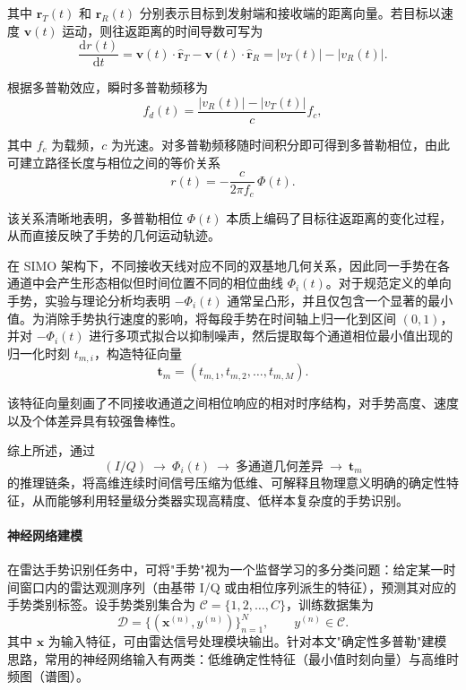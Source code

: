 其中 $\mathbf{r}_T(t)$ 和 $\mathbf{r}_R(t)$ 分别表示目标到发射端和接收端的距离向量。若目标以速度 $\mathbf{v}(t)$ 运动，则往返距离的时间导数可写为
\begin{equation}
\frac{\mathrm{d}r(t)}{\mathrm{d}t}
=
\mathbf{v}(t)\cdot\hat{\mathbf{r}}_T
-
\mathbf{v}(t)\cdot\hat{\mathbf{r}}_R
=
|v_T(t)|-|v_R(t)|.
\end{equation}

根据多普勒效应，瞬时多普勒频移为
\begin{equation}
f_d(t)=\frac{|v_R(t)|-|v_T(t)|}{c}f_c,
\end{equation}

其中 $f_c$ 为载频，$c$ 为光速。对多普勒频移随时间积分即可得到多普勒相位，由此可建立路径长度与相位之间的等价关系
\begin{equation}
r(t) = -\frac{c}{2\pi f_c}\,\Phi(t).
\end{equation}

该关系清晰地表明，多普勒相位 $\Phi(t)$ 本质上编码了目标往返距离的变化过程，从而直接反映了手势的几何运动轨迹。

在 SIMO 架构下，不同接收天线对应不同的双基地几何关系，因此同一手势在各通道中会产生形态相似但时间位置不同的相位曲线 $\Phi_i(t)$。对于规范定义的单向手势，实验与理论分析均表明 $-\Phi_i(t)$ 通常呈凸形，并且仅包含一个显著的最小值。为消除手势执行速度的影响，将每段手势在时间轴上归一化到区间 $(0,1)$，并对 $-\Phi_i(t)$ 进行多项式拟合以抑制噪声，然后提取每个通道相位最小值出现的归一化时刻 $t_{m,i}$，构造特征向量
\begin{equation}
\mathbf{t}_m=(t_{m,1},t_{m,2},\ldots,t_{m,M}).
\end{equation}

该特征向量刻画了不同接收通道之间相位响应的相对时序结构，对手势高度、速度以及个体差异具有较强鲁棒性。

综上所述，通过
\begin{equation}
(I/Q)\ \rightarrow\ \Phi_i(t)\ \rightarrow\ \text{多通道几何差异}\ \rightarrow\ \mathbf{t}_m
\end{equation}
的推理链条，将高维连续时间信号压缩为低维、可解释且物理意义明确的确定性特征，从而能够利用轻量级分类器实现高精度、低样本复杂度的手势识别。

\paragraph{神经网络建模}
在雷达手势识别任务中，可将"手势"视为一个监督学习的多分类问题：给定某一时间窗口内的雷达观测序列（由基带 I/Q 或由相位序列派生的特征），预测其对应的手势类别标签。设手势类别集合为 $\mathcal{C}=\{1,2,\dots,C\}$，训练数据集为
\begin{equation}
\mathcal{D}=\{(\mathbf{x}^{(n)},y^{(n)})\}_{n=1}^{N},\qquad y^{(n)}\in\mathcal{C}.
\end{equation}
其中 $\mathbf{x}$ 为输入特征，可由雷达信号处理模块输出。针对本文"确定性多普勒"建模思路，常用的神经网络输入有两类：低维确定性特征（最小值时刻向量）与高维时频图（谱图）。

